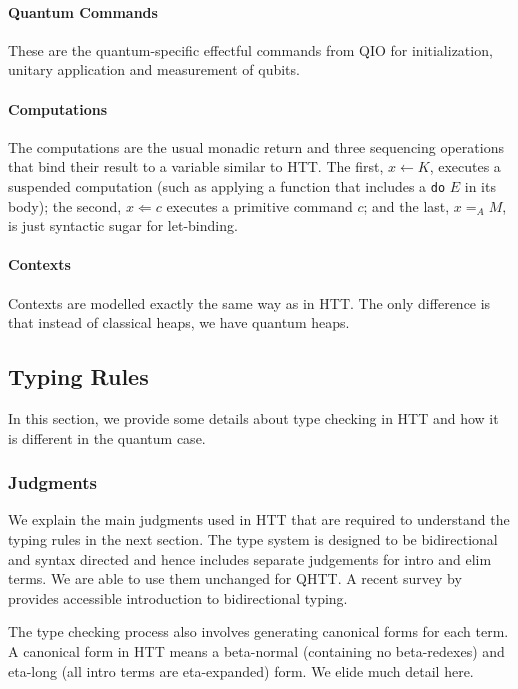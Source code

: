 \documentclass[acmsmall,nonacm,timestamp,review=false,anonymous=false]{acmart}
\begin{document}
\paragraph{Quantum Commands}
These are the quantum-specific effectful commands from QIO for initialization, unitary application and measurement of qubits.

\paragraph{Computations} The computations are the usual monadic return and three sequencing operations that bind their result to a variable similar to HTT. The first, $x \leftarrow K$, executes a suspended computation (such as applying a function that includes a \texttt{do} $E$ in its body); the second, $x \Leftarrow c$ executes a primitive command $c$; and the last, $x =_A M$, is just syntactic sugar for let-binding.

\paragraph{Contexts} Contexts are modelled exactly the same way as in HTT. The only difference is that instead of classical heaps, we have quantum heaps.

\subsection{Typing Rules}
\label{sec:typing}

In this section, we provide some details about type checking in HTT and how it is different in the quantum case.

\subsubsection{Judgments}
We explain the main judgments used in HTT that are required to understand the typing rules in the next section. The type system is designed to be bidirectional and syntax directed and hence includes separate judgements for intro and elim terms. We are able to use them unchanged for QHTT. A recent survey by \citet{dunfield2019bidirectional} provides accessible introduction to bidirectional typing.

The type checking process also involves generating canonical forms for each term. A canonical form in HTT means a beta-normal (containing no beta-redexes) and eta-long (all intro terms are eta-expanded) form. We elide much detail here.
\end{document}
